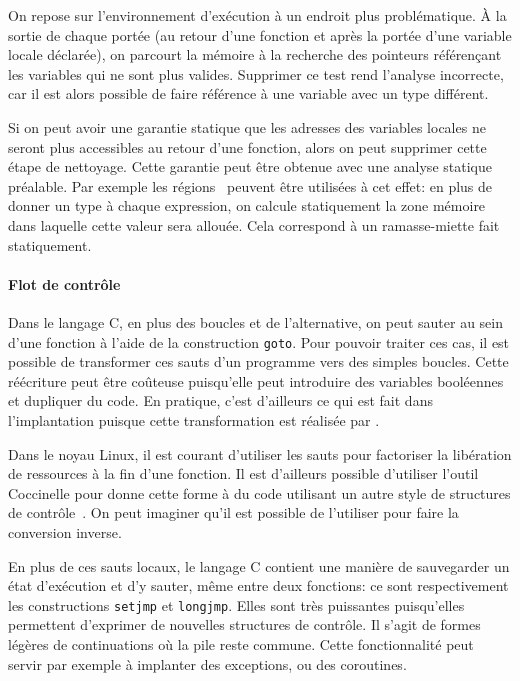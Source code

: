 On repose sur l'environnement d'exécution à un endroit plus problématique. À la
sortie de chaque portée (au retour d'une fonction et après la portée d'une
variable locale déclarée), on parcourt la mémoire à la recherche des pointeurs
référençant les variables qui ne sont plus valides. Supprimer ce test rend
l'analyse incorrecte, car il est alors possible de faire référence à une
variable avec un type différent.

Si on peut avoir une garantie statique que les adresses des variables locales ne
seront plus accessibles au retour d'une fonction, alors on peut supprimer cette
étape de nettoyage. Cette garantie peut être obtenue avec une analyse statique
préalable. Par exemple les régions~\cite{jfp92} peuvent être utilisées à cet
effet: en plus de donner un type à chaque expression, on calcule
statiquement la zone mémoire dans laquelle cette valeur sera allouée. Cela
correspond à un ramasse-miette fait statiquement.


\paragraph{Flot de contrôle}

Dans le langage C, en plus des boucles et de l'alternative, on peut sauter au
sein d'une fonction à l'aide de la construction \texttt{goto}. Pour pouvoir
traiter ces cas, il est possible de transformer ces sauts d'un programme vers
des simples boucles. Cette réécriture peut être coûteuse puisqu'elle peut
introduire des variables booléennes et dupliquer du code. En pratique, c'est
d'ailleurs ce qui est fait dans l'implantation puisque cette transformation est
réalisée par \ctonewspeak.

Dans le noyau Linux, il est courant d'utiliser les sauts pour factoriser la
libération de ressources à la fin d'une fonction. Il est d'ailleurs possible
d'utiliser l'outil Coccinelle pour donne cette forme à du code utilisant un
autre style de structures de contrôle~\cite{lctes11}. On peut imaginer qu'il est
possible de l'utiliser pour faire la conversion inverse.

En plus de ces sauts locaux, le langage C contient une manière de sauvegarder un
état d'exécution et d'y sauter, même entre deux fonctions: ce sont
respectivement les constructions \texttt{setjmp} et \texttt{longjmp}. Elles sont
très puissantes puisqu'elles permettent d'exprimer de nouvelles structures de
contrôle. Il s'agit de formes légères de continuations où la pile reste commune.
Cette fonctionnalité peut servir par exemple à implanter des exceptions, ou des
coroutines.


